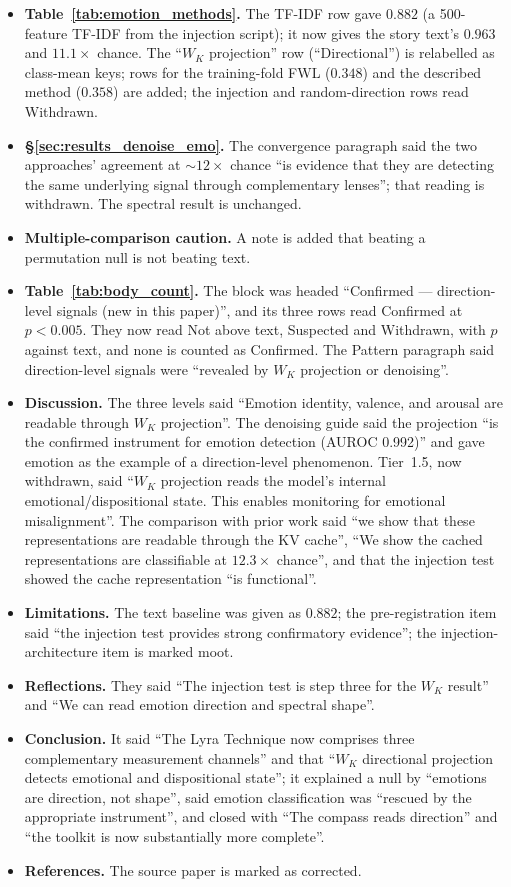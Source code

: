 \documentclass[11pt,a4paper]{article}
\begin{document}
\begin{itemize}[nosep]
  text content''.
\item \textbf{Table~\ref{tab:emotion_methods}.} The TF-IDF row gave $0.882$
  (a 500-feature TF-IDF from the injection script); it now gives the story
  text's $0.963$ and $11.1\times$ chance. The ``$W_K$ projection'' row
  (``Directional'') is relabelled as class-mean keys; rows for the
  training-fold FWL ($0.348$) and the described method ($0.358$) are added;
  the injection and random-direction rows read Withdrawn.
\item \textbf{\S\ref{sec:results_denoise_emo}.} The convergence paragraph
  said the two approaches' agreement at $\sim$$12\times$ chance ``is evidence
  that they are detecting the same underlying signal through complementary
  lenses''; that reading is withdrawn. The spectral result is unchanged.
\item \textbf{Multiple-comparison caution.} A note is added that beating a
  permutation null is not beating text.
\item \textbf{Table~\ref{tab:body_count}.} The block was headed
  ``Confirmed --- direction-level signals (new in this paper)'', and its
  three rows read Confirmed at $p < 0.005$. They now read Not above text,
  Suspected and Withdrawn, with $p$ against text, and none is counted as
  Confirmed. The Pattern paragraph said direction-level signals were
  ``revealed by $W_K$ projection or denoising''.
\item \textbf{Discussion.} The three levels said ``Emotion identity,
  valence, and arousal are readable through $W_K$ projection''. The
  denoising guide said the projection ``is the confirmed instrument for
  emotion detection (AUROC 0.992)'' and gave emotion as the example of a
  direction-level phenomenon. Tier~1.5, now withdrawn, said ``$W_K$
  projection reads the model's internal emotional/dispositional state. This
  enables monitoring for emotional misalignment''. The comparison with prior
  work said ``we show that these representations are readable through the KV
  cache'', ``We show the cached representations are classifiable at
  $12.3\times$ chance'', and that the injection test showed the cache
  representation ``is functional''.
\item \textbf{Limitations.} The text baseline was given as $0.882$; the
  pre-registration item said ``the injection test provides strong
  confirmatory evidence''; the injection-architecture item is marked moot.
\item \textbf{Reflections.} They said ``The injection test is step three for
  the $W_K$ result'' and ``We can read emotion direction and spectral
  shape''.
\item \textbf{Conclusion.} It said ``The Lyra Technique now comprises three
  complementary measurement channels'' and that ``$W_K$ directional
  projection detects emotional and dispositional state''; it explained a
  null by ``emotions are direction, not shape'', said emotion classification
  was ``rescued by the appropriate instrument'', and closed with ``The
  compass reads direction'' and ``the toolkit is now substantially more
  complete''.
\item \textbf{References.} The source paper is marked as corrected.
\end{itemize}
\end{document}
